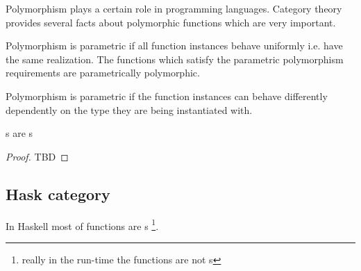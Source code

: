 Polymorphism plays a certain role in programming languages. Category
theory provides several facts about polymorphic functions which are
very important.

\begin{definition}
\label{def:pp_function}
Polymorphism is parametric if all function instances behave uniformly
i.e. have the same realization. The functions which satisfy the
parametric polymorphism requirements are parametrically polymorphic.
\end{definition}

\begin{definition}
\label{def:ad_hoc_polymorphism}
Polymorphism is parametric if the function instances can behave
differently dependently on the type they are being instantiated with. 
\end{definition}

\begin{theorem}[Reynolds]
\label{thm:reynolds}
s are s 
\begin{proof}
TBD
\end{proof}
\end{theorem}

\subsection{\textbf{Hask} category}

In Haskell most of functions are s 
\footnote{really in the run-time the functions are not
  s}.  

